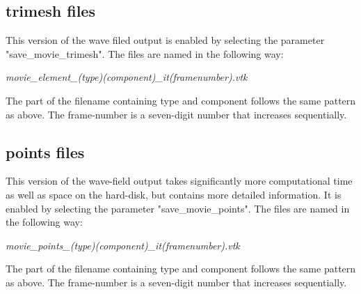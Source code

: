 		\subsection{trimesh files}
			This version of the wave filed output is enabled by selecting the parameter "save\_movie\_trimesh". The files are named in the following way:
			\begin{center}%
				\emph{movie\_element\_(type)(component)\_it(framenumber).vtk}
			\end{center}
			The part of the filename containing type and component follows the same pattern as above. The frame-number is a seven-digit number that increases sequentially. \\

		
		\subsection{points files}
			This version of the wave-field output takes significantly more computational time as well as space on the hard-disk, but contains more detailed information. It is enabled by selecting the parameter "save\_movie\_points". The files are named in the following way:
			\begin{center}%
				\emph{movie\_points\_(type)(component)\_it(framenumber).vtk}
			\end{center}
			The part of the filename containing type and component follows the same pattern as above. The frame-number is a seven-digit number that increases sequentially. \\

			 \\